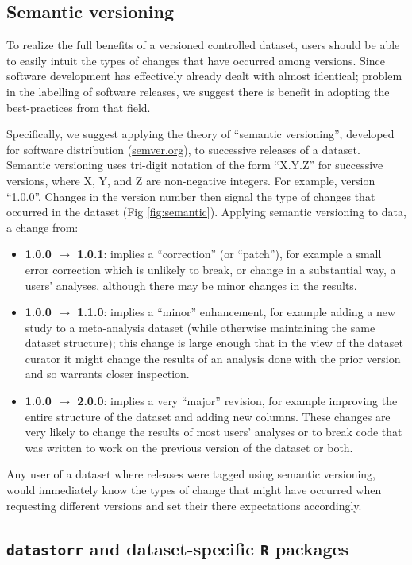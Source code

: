 \documentclass[a4paper,11pt]{article}
\begin{document}
\subsection{Semantic versioning}

To realize the full benefits of a versioned controlled dataset, users should be able to easily intuit the types of changes that have occurred among versions. Since software development has effectively already dealt with almost identical; problem in the labelling of software releases, we suggest there is benefit in adopting the best-practices from that field.

Specifically, we suggest applying the theory of ``semantic versioning'', developed for software distribution (\href{http://semver.org/}{semver.org}), to successive releases of a dataset. Semantic versioning uses tri-digit notation of the form ``X.Y.Z'' for successive versions, where X, Y, and Z are non-negative integers. For example, version ``1.0.0''. Changes in the version number then signal the type of changes that occurred in the dataset (Fig \ref{fig:semantic}). Applying semantic versioning to data, a change from:
\begin{itemize}
  \item {\bf 1.0.0 $\rightarrow$ 1.0.1}: implies a ``correction'' (or ``patch''), for example a small error correction which is unlikely to break, or change in a substantial way, a users' analyses, although there may be minor changes in the results.
  \item {\bf 1.0.0 $\rightarrow$ 1.1.0}: implies a ``minor'' enhancement, for example adding a new study to a meta-analysis dataset (while otherwise maintaining the same dataset structure); this change is large enough that in the view of the dataset curator it might change the results of an analysis done with the prior version and so warrants closer inspection.
  \item {\bf 1.0.0 $\rightarrow$ 2.0.0}: implies a very ``major'' revision, for example improving the entire structure of the dataset and adding new columns. These changes are very likely to change the results of most users' analyses or to break code that was written to work on the previous version of the dataset or both.
\end{itemize}
Any user of a dataset where releases were tagged using semantic versioning, would immediately know the types of change that might have occurred when requesting different versions and set their there expectations accordingly.


\subsection{\texttt{datastorr} and dataset-specific \texttt{R} packages}
\end{document}
